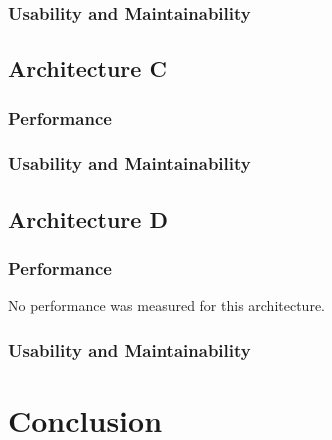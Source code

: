 \documentclass{article}
\begin{document}
\subsubsection{Usability and Maintainability}

\subsection{Architecture C}
\subsubsection{Performance}

\subsubsection{Usability and Maintainability}

\subsection{Architecture D}
\subsubsection{Performance}
No performance was measured for this architecture.

\subsubsection{Usability and Maintainability}

\section{Conclusion}
\end{document}
